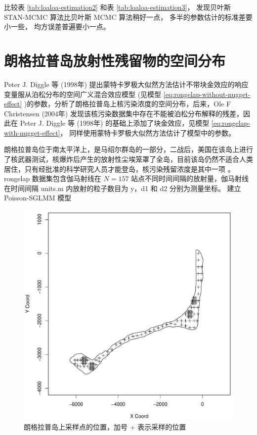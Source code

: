 \documentclass[12pt,a4paper,UTF8,twoside]{book}
\theoremstyle{definition}
\theoremstyle{definition}
\theoremstyle{definition}
\theoremstyle{remark}
\begin{document}
比较表 \ref{tab:loaloa-estimation2} 和表 \ref{tab:loaloa-estimation3}，
发现贝叶斯 STAN-MCMC 算法比贝叶斯 MCMC 算法稍好一点，
多半的参数估计的标准差要小一些， 均方误差普遍要小一点。

\hypertarget{rongelap}{%
\section{朗格拉普岛放射性残留物的空间分布}\label{rongelap}}

Peter J. Diggle 等 (1998年) \citep{Diggle1998}
提出蒙特卡罗极大似然方法估计不带块金效应的响应变量服从泊松分布的空间广义混合效应模型
(见模型 \eqref{eq:rongelap-without-nugget-effect}
)的参数，分析了朗格拉普岛上核污染浓度的空间分布，后来，Ole F Christensen
(2004年) \citep{Christensen2004}
发现该核污染数据集中存在不能被泊松分布解释的残差，因此在 Peter J. Diggle
等 (1998年) \citep{Diggle1998} 的基础上添加了块金效应，见模型
\eqref{eq:rongelap-with-nugget-effect}，
同样使用蒙特卡罗极大似然方法估计了模型中的参数。

朗格拉普岛位于南太平洋上，是马绍尔群岛的一部分，二战后，美国在该岛上进行了核武器测试，核爆炸后产生的放射性尘埃笼罩了全岛，目前该岛仍然不适合人类居住，只有经批准的科学研究人员才能登岛，核污染残留浓度是其中一项
\citep{Bordner2016}。rongelap 数据集包含伽马射线在 \(N=157\)
站点不同时间间隔的放射量，伽马射线在时间间隔 units.m 内放射的粒子数目为
y，d1 和 d2 分别为测量坐标。 建立 Poisson-SGLMM 模型

\begin{figure}

{\centering \includegraphics[width=0.7\linewidth]{figures/rongelap-island} 

}

\caption{朗格拉普岛上采样点的位置，加号 + 表示采样的位置}\label{fig:rongelap-dataset}
\end{figure}
\end{document}
